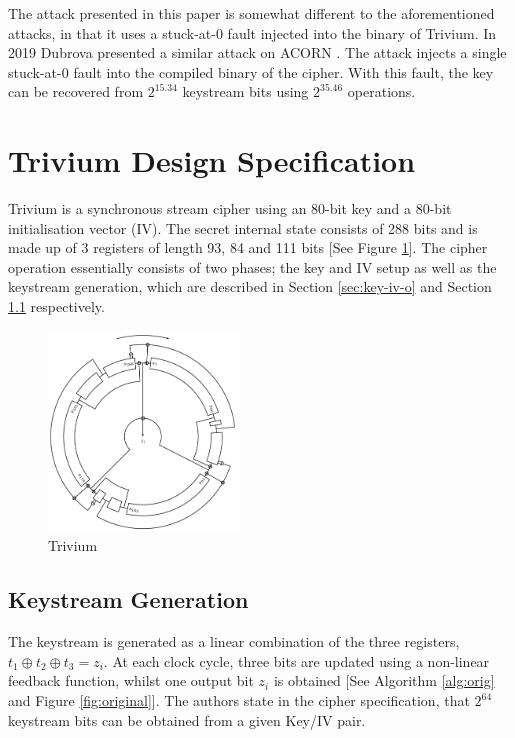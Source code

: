 \documentclass[conference]{IEEEtran}
\begin{document}
The attack presented in this paper is somewhat different to the aforementioned attacks, in that it uses a stuck-at-0 fault injected into the binary of Trivium. In 2019 Dubrova presented a similar attack on ACORN \cite{Dubrova}. The attack injects a single stuck-at-0 fault into the compiled binary of the cipher. With this fault, the key can be recovered from $2^{15.34}$ keystream bits using $2^{35.46}$ operations.

\section{Trivium Design Specification}\label{sec:spec}

Trivium is a synchronous stream cipher using an 80-bit key and a 80-bit initialisation vector (IV). The secret internal state consists of 288 bits and is made up of 3 registers of length 93, 84 and 111 bits [See Figure \ref{fig:circle}]. The cipher operation essentially consists of two phases; the key and IV setup as well as the keystream generation, which are described in Section \ref{sec:key-iv-o} and Section \ref{sec:key-gen-o} respectively.

\begin{figure}[H]
\centering
\includegraphics[width=0.45\textwidth]{figures/round.png}
\caption{Trivium \cite{circle}}
\label{fig:circle}
\end{figure}

\subsection{Keystream Generation}\label{sec:key-gen-o}
The keystream is generated as a linear combination of the three registers, $t_1\oplus t_2\oplus t_3=z_i$. At each clock cycle, three bits are updated using a non-linear feedback function, whilst one output bit $z_i$ is obtained [See Algorithm \ref{alg:orig} and Figure \ref{fig:original}]. The authors state in the cipher specification, that $2^{64}$ keystream bits can be obtained from a given Key/IV pair.
\end{document}
